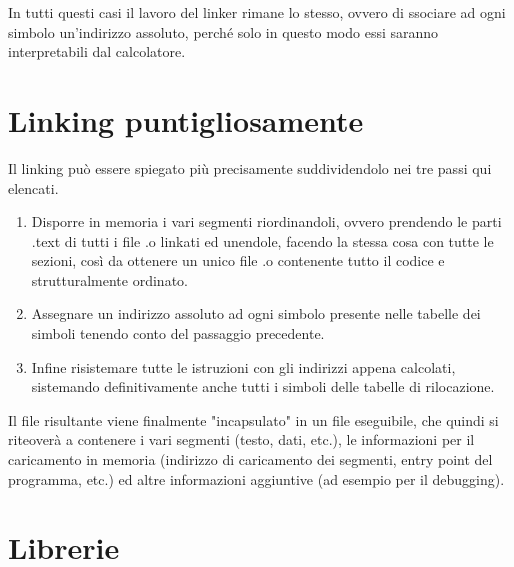 \documentclass[class=book, crop=false, oneside]{standalone}
\begin{document}
In tutti questi casi il lavoro del linker rimane lo stesso, ovvero di ssociare ad ogni simbolo un'indirizzo assoluto, perché solo in questo modo essi saranno interpretabili dal calcolatore.

\section{Linking puntigliosamente}

Il linking può essere spiegato più precisamente suddividendolo nei tre passi qui elencati.
\begin{enumerate}
	\item Disporre in memoria i vari segmenti riordinandoli, ovvero prendendo le parti .text di tutti i file .o linkati ed unendole, facendo la stessa cosa con tutte le sezioni, così da ottenere un unico file .o contenente tutto il codice e strutturalmente ordinato.
	\item Assegnare un indirizzo assoluto ad ogni simbolo presente nelle tabelle dei simboli tenendo conto del passaggio precedente.
	\item Infine risistemare tutte le istruzioni con gli indirizzi appena calcolati, sistemando definitivamente anche tutti i simboli delle tabelle di rilocazione.
\end{enumerate}

Il file risultante viene finalmente "incapsulato" in un file eseguibile, che quindi si riteoverà a contenere i vari segmenti (testo, dati, etc.), le informazioni per il caricamento in memoria (indirizzo di caricamento dei segmenti, entry point del programma, etc.) ed altre informazioni aggiuntive (ad esempio per il debugging).

\section{Librerie}



\end{document}
